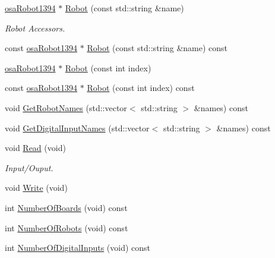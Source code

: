 \begin{DoxyCompactItemize}
\hyperlink{classsaw_robot_i_o1394_1_1osa_robot1394}{osa\+Robot1394} $\ast$ \hyperlink{classsaw_robot_i_o1394_1_1osa_port1394_af2f6610aeec705984041bcc435bc5dda}{Robot} (const std\+::string \&name)
\begin{DoxyCompactList}\small\item\em Robot Accessors. \end{DoxyCompactList}\item 
const \hyperlink{classsaw_robot_i_o1394_1_1osa_robot1394}{osa\+Robot1394} $\ast$ \hyperlink{classsaw_robot_i_o1394_1_1osa_port1394_abf75669ed82aabf5820c24de301fc868}{Robot} (const std\+::string \&name) const 
\item 
\hyperlink{classsaw_robot_i_o1394_1_1osa_robot1394}{osa\+Robot1394} $\ast$ \hyperlink{classsaw_robot_i_o1394_1_1osa_port1394_a9e2096e401adb5565a3314b1090c4be8}{Robot} (const int index)
\item 
const \hyperlink{classsaw_robot_i_o1394_1_1osa_robot1394}{osa\+Robot1394} $\ast$ \hyperlink{classsaw_robot_i_o1394_1_1osa_port1394_aca859be1603e6b7bf476177eec73e8d3}{Robot} (const int index) const 
\item 
void \hyperlink{classsaw_robot_i_o1394_1_1osa_port1394_a485394fb1a256776d088ced3eaa7fe73}{Get\+Robot\+Names} (std\+::vector$<$ std\+::string $>$ \&names) const 
\item 
void \hyperlink{classsaw_robot_i_o1394_1_1osa_port1394_ae38f23f3b69d049933cb56a10eb22cb2}{Get\+Digital\+Input\+Names} (std\+::vector$<$ std\+::string $>$ \&names) const 
\item 
void \hyperlink{classsaw_robot_i_o1394_1_1osa_port1394_a9426141a8a2a0e6392d9991cf331d8a9}{Read} (void)
\begin{DoxyCompactList}\small\item\em Input/\+Ouput. \end{DoxyCompactList}\item 
void \hyperlink{classsaw_robot_i_o1394_1_1osa_port1394_a184cfc9bef655e767a5e435bf68ae3a1}{Write} (void)
\item 
int \hyperlink{classsaw_robot_i_o1394_1_1osa_port1394_adec1e0b7a0699abc8a309412bf174e61}{Number\+Of\+Boards} (void) const 
\item 
int \hyperlink{classsaw_robot_i_o1394_1_1osa_port1394_a6618de9e761633e735240598f6cb46ee}{Number\+Of\+Robots} (void) const 
\item 
int \hyperlink{classsaw_robot_i_o1394_1_1osa_port1394_a2841337671c67505f15776cef83c127d}{Number\+Of\+Digital\+Inputs} (void) const 
\end{DoxyCompactItemize}
